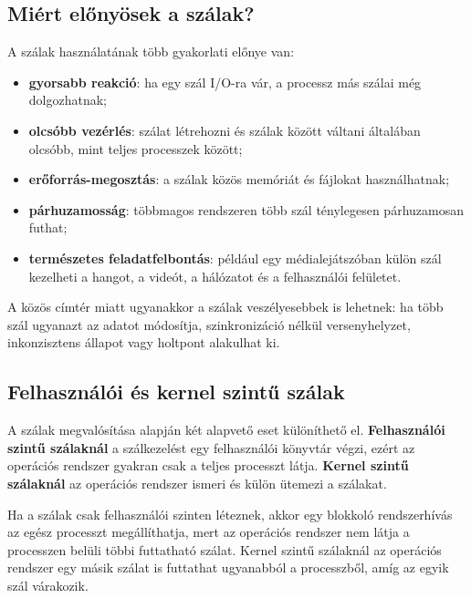 \subsection{Miért előnyösek a szálak?}

A szálak használatának több gyakorlati előnye van:

\begin{itemize}
  \item \textbf{gyorsabb reakció}: ha egy szál I/O-ra vár, a processz más szálai még dolgozhatnak;
  \item \textbf{olcsóbb vezérlés}: szálat létrehozni és szálak között váltani általában olcsóbb, mint teljes processzek között;
  \item \textbf{erőforrás-megosztás}: a szálak közös memóriát és fájlokat használhatnak;
  \item \textbf{párhuzamosság}: többmagos rendszeren több szál ténylegesen párhuzamosan futhat;
  \item \textbf{természetes feladatfelbontás}: például egy médialejátszóban külön szál kezelheti a hangot, a videót, a hálózatot és a felhasználói felületet.
\end{itemize}

A közös címtér miatt ugyanakkor a szálak veszélyesebbek is lehetnek: ha több szál ugyanazt az adatot módosítja, szinkronizáció nélkül versenyhelyzet, inkonzisztens állapot vagy holtpont alakulhat ki.

\begin{center}

\end{center}

\subsection{Felhasználói és kernel szintű szálak}

A szálak megvalósítása alapján két alapvető eset különíthető el. \textbf{Felhasználói szintű szálaknál} a szálkezelést egy felhasználói könyvtár végzi, ezért az operációs rendszer gyakran csak a teljes processzt látja. \textbf{Kernel szintű szálaknál} az operációs rendszer ismeri és külön ütemezi a szálakat.

\begin{center}

\end{center}

Ha a szálak csak felhasználói szinten léteznek, akkor egy blokkoló rendszerhívás az egész processzt megállíthatja, mert az operációs rendszer nem látja a processzen belüli többi futtatható szálat. Kernel szintű szálaknál az operációs rendszer egy másik szálat is futtathat ugyanabból a processzből, amíg az egyik szál várakozik.

